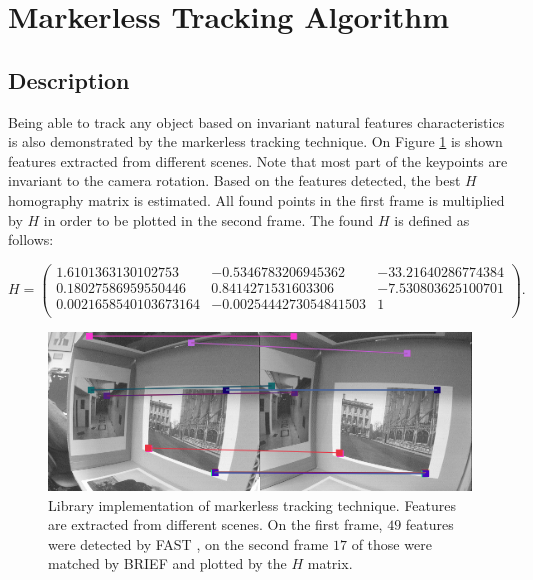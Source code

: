

\section{Markerless Tracking Algorithm} %
\label{sec:evaluation:markerless_tracking_algorithm}

\subsection{Description} %
\label{sub:evaluation:markerless_tracking_algorithm:description}

Being able to track any object based on invariant natural features characteristics is also demonstrated by the markerless tracking technique. On Figure \ref{figure:keypoints_building} is shown features extracted from different scenes. Note that most part of the keypoints are invariant to the camera rotation. Based on the features detected, the best $H$ homography matrix is estimated. All found points in the first frame is multiplied by $H$ in order to be plotted in the second frame. The found $H$ is defined as follows:

$$H=\begin{pmatrix}1.6101363130102753 & -0.5346783206945362 & -33.21640286774384\\ 0.18027586959550446 & 0.8414271531603306 & -7.530803625100701\\ 0.0021658540103673164 & -0.0025444273054841503 & 1\\\end{pmatrix}.$$

\begin{figure}[!htb]
  \centering
  \includegraphics[width=\linewidth]{chapters/evaluation/keypoints_building.png}
  \caption{Library implementation of markerless tracking technique. Features are extracted from different scenes. On the first frame, $49$ features were detected by FAST \cite{RostenFaster2010}, on the second frame $17$ of those were matched by BRIEF \cite{Calonder2010} and plotted by the $H$ matrix.}
  \label{figure:keypoints_building}
\end{figure}


